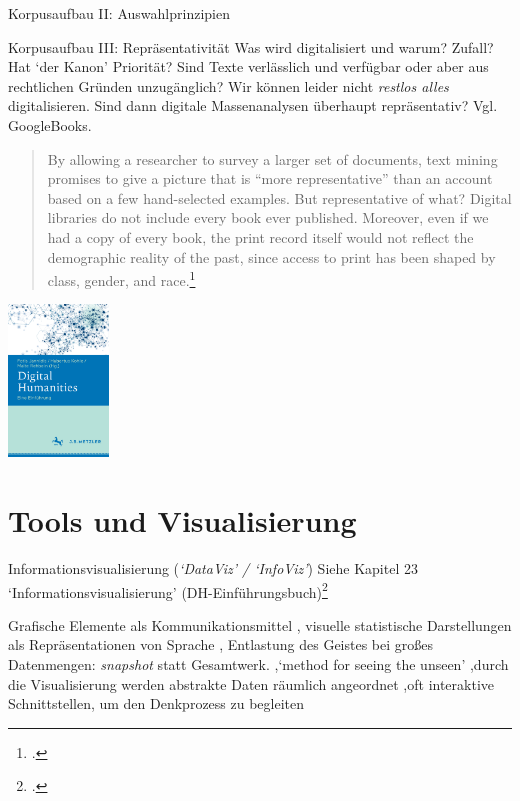 \documentclass[10pt,a4paper]{article}
\begin{document}
\begin{multicols}{3}
\begin{textbox}{Korpusaufbau II: Auswahlprinzipien}
\end{textbox}



\begin{textbox}{Korpusaufbau III: Repräsentativität}
Was wird digitalisiert und warum? Zufall? Hat `der Kanon' Priorität? Sind Texte verlässlich und verfügbar oder aber aus rechtlichen Gründen unzugänglich? Wir können leider nicht \emph{restlos alles} digitalisieren. Sind dann digitale Massenanalysen überhaupt repräsentativ? Vgl. GoogleBooks.

\begin{quote}
    By allowing a researcher to survey a larger set of documents, text mining promises to give a picture \punkti that is ``more representative'' than an account based on a few hand-selected examples. But representative of what?
    Digital libraries \punkti do not include every book ever published. Moreover, even if we had a copy of every book, the print record itself would not reflect the demographic reality of the past, since access to print has been shaped by class, gender, and race.\footcite[300--301]{textmining}
\end{quote}
\end{textbox}

\vspace{2em}


\href{https://www.springer.com/de/book/9783476026224}{\includegraphics[width=0.2\textwidth]{dh-einf.png}}


\newpage
\section{Tools und Visualisierung}


\begin{textbox}{Informationsvisualisierung (\emph{`DataViz' / `InfoViz'})}
Siehe Kapitel 23 `Informationsvisualisierung' (DH-Einführungsbuch)\footcite[vgl.][]{DHIntroRehbeinInfoviz}


Grafische Elemente als Kommunikationsmittel \sep
visuelle statistische Darstellungen als Repräsentationen von Sprache \sep
Entlastung des Geistes bei großes Datenmengen: \emph{snapshot} statt Gesamtwerk. \sep `method for seeing the unseen' \sep durch die Visualisierung werden abstrakte Daten räumlich angeordnet \sep oft interaktive Schnittstellen, um den Denkprozess zu begleiten 


\end{textbox}
\end{multicols}
\end{document}
